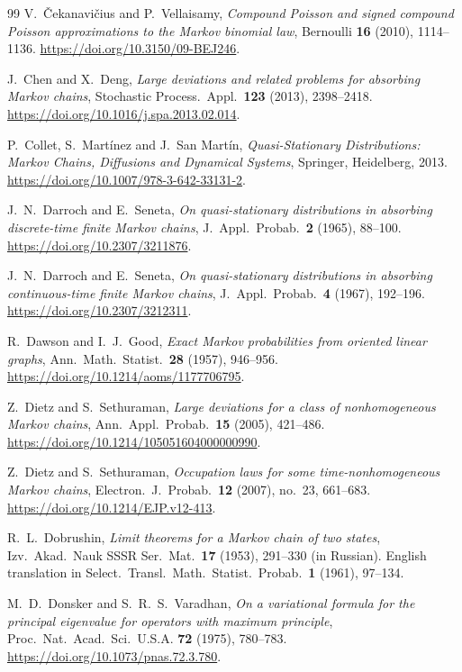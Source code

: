 \begin{thebibliography}{99}
V.~\v{C}ekanavi\v{c}ius and P.~Vellaisamy, \emph{Compound Poisson and signed
compound Poisson approximations to the Markov binomial law}, Bernoulli
\textbf{16} (2010), 1114--1136. \url{https://doi.org/10.3150/09-BEJ246}.

J.~Chen and X.~Deng, \emph{Large deviations and related problems for absorbing
Markov chains}, Stochastic Process.~Appl.~\textbf{123} (2013), 2398--2418.
\url{https://doi.org/10.1016/j.spa.2013.02.014}.

P.~Collet, S.~Mart\'inez and J.~San Mart\'in, \emph{Quasi-Stationary
Distributions: Markov Chains, Diffusions and Dynamical Systems}, Springer,
Heidelberg, 2013. \url{https://doi.org/10.1007/978-3-642-33131-2}.

J.~N.~Darroch and E.~Seneta, \emph{On quasi-stationary distributions in
absorbing discrete-time finite Markov chains}, J.~Appl.~Probab.~\textbf{2}
(1965), 88--100. \url{https://doi.org/10.2307/3211876}.

J.~N.~Darroch and E.~Seneta, \emph{On quasi-stationary distributions in
absorbing continuous-time finite Markov chains}, J.~Appl.~Probab.~\textbf{4}
(1967), 192--196. \url{https://doi.org/10.2307/3212311}.

R.~Dawson and I.~J.~Good, \emph{Exact Markov probabilities from oriented
linear graphs}, Ann.~Math.~Statist.~\textbf{28} (1957), 946--956.
\url{https://doi.org/10.1214/aoms/1177706795}.

Z.~Dietz and S.~Sethuraman, \emph{Large deviations for a class of
nonhomogeneous Markov chains}, Ann.~Appl.~Probab.~\textbf{15} (2005),
421--486. \url{https://doi.org/10.1214/105051604000000990}.

Z.~Dietz and S.~Sethuraman, \emph{Occupation laws for some
time-nonhomogeneous Markov chains}, Electron.~J.~Probab.~\textbf{12} (2007),
no.~23, 661--683. \url{https://doi.org/10.1214/EJP.v12-413}.

R.~L.~Dobrushin, \emph{Limit theorems for a Markov chain of two states},
Izv.~Akad.~Nauk SSSR Ser.~Mat.~\textbf{17} (1953), 291--330 (in Russian). English translation in Select.~Transl.~Math.~Statist.~Probab.~\textbf{1} (1961), 97--134.

M.~D.~Donsker and S.~R.~S.~Varadhan, \emph{On a variational formula for the
principal eigenvalue for operators with maximum principle}, Proc.~Nat.~Acad.~Sci.~U.S.A.
\textbf{72} (1975), 780--783. \url{https://doi.org/10.1073/pnas.72.3.780}.


\end{thebibliography}
